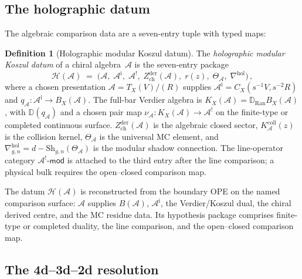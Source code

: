 \documentclass[11pt,reqno]{amsart}
\theoremstyle{definition}
\newtheorem{definition}[theorem]{Definition}
\theoremstyle{remark}
\newcommand{\cA}{\mathcal{A}}
\newcommand{\cH}{\mathcal{H}}
\newcommand{\Ran}{\mathrm{Ran}}
\numberwithin{equation}{section}
\begin{document}
\subsection{The holographic datum}
\label{ssec:holographic-datum}

The algebraic comparison data are a seven-entry tuple with typed maps:

\begin{definition}[Holographic modular Koszul datum]
\label{def:holographic}
The \emph{holographic modular Koszul datum} of a chiral
algebra~$\cA$ is the seven-entry package
\begin{equation}\label{eq:holographic-datum}
\cH(\cA)
\;=\;
\bigl(\cA,\;
\cA^{\mathrm i},\;
\cA^!,\;
Z^{\mathrm{der}}_{\mathrm{ch}}(\cA),\;
r(z),\;
\Theta_\cA,\;
\nabla^{\mathrm{hol}}\bigr)\,,
\end{equation}
where a chosen presentation $\cA=T_X(V)/(R)$ supplies
$\cA^{\mathrm i}=C_X(s^{-1}V,s^{-2}R)$ and
$q_\cA\colon\cA^{\mathrm i}\to B_X(\cA)$.
The full-bar Verdier algebra is
$K_X(\cA)=\mathbb D_{\Ran}B_X(\cA)$, with
$\mathbb D(q_\cA)$ and a chosen pair map
$\nu_\cA\colon K_X(\cA)\to\cA^!$ on the finite-type or completed
continuous surface.
$Z^{\mathrm{der}}_{\mathrm{ch}}(\cA)$ is the algebraic closed
sector, $K_\cA^{\mathrm{coll}}(z)$ is the collision kernel,
$\Theta_\cA$ is the universal MC element, and
$\nabla^{\mathrm{hol}}_{g,n} = d -
\mathrm{Sh}_{g,n}(\Theta_\cA)$ is the modular shadow
connection. The line-operator category
$\cA^!\text{-}\mathsf{mod}$ is attached to the third entry after
the line comparison; a physical bulk requires the open--closed
comparison map.
\end{definition}

The datum $\cH(\cA)$ is reconstructed from the boundary OPE
on the named comparison surface: $\cA$ supplies $B(\cA)$,
$\cA^{\mathrm i}$, the Verdier/Koszul dual, the chiral derived
centre, and the MC residue data.  Its hypothesis package comprises
finite-type or completed duality, the line comparison, and the
open--closed comparison map.

\subsection{The 4d--3d--2d resolution}
\label{ssec:4d-3d-2d}
\end{document}
